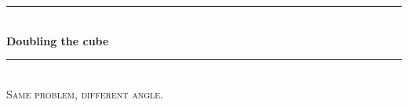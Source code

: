\documentclass[12pt, letterpaper, oneside]{report}
\begin{document}
\begin{titlepage}

\newcommand{\HRule}{\rule{\linewidth}{0.5mm}} %

\center %
 




\HRule \\[0.8cm]
{ \huge \bfseries Doubling the cube}\\[0.4cm] %
\HRule \\[1.5cm]
\textsc{\large  Same problem, different angle.}\\[0.5cm] 

\begin{minipage}{0.8\textwidth}
\begin{center} \large


\end{center}

\begin{center}

\end{center}

\end{minipage}



\end{titlepage}
\end{document}
